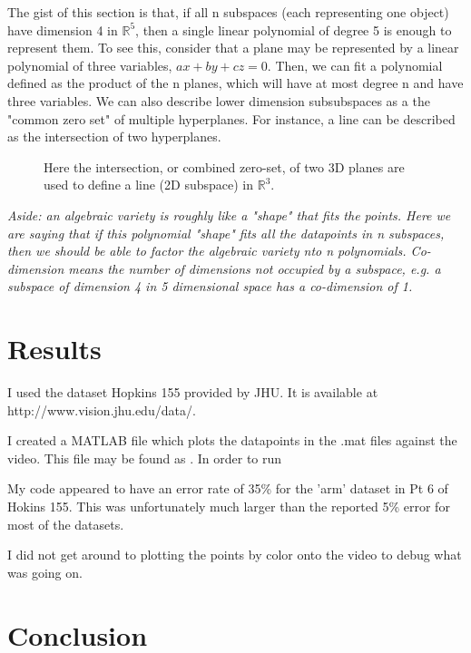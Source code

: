 \documentclass[a4paper]{article}
\begin{document}
 The gist of this section is that, if all n subspaces (each representing one object) have dimension 4 in $\mathbb{R}^5$, then a single linear
 polynomial of degree 5 is enough to represent them. To see this, consider that a plane may be represented by a linear polynomial of three variables,
 $ax+by+cz = 0$. Then, we can fit a polynomial defined as the product of the n planes, which will have at most degree n and have three variables. We
 can also describe lower dimension subsubspaces as a the "common zero set" of multiple hyperplanes. For instance, a line can be described as the
 intersection of two hyperplanes. 


 \begin{figure} \centering
     \caption{Here the intersection, or combined zero-set, of two 3D planes are used to define a line (2D subspace) in $\mathbb{R}^3$.} \end{figure}

 \textit{Aside: an algebraic variety is roughly like a "shape" that fits the points. Here we are saying that if this polynomial "shape" fits all the
 datapoints in n subspaces, then we should be able to factor the algebraic variety nto n polynomials.  Co-dimension means the number of dimensions not
 occupied by a subspace, e.g. a subspace of dimension 4 in 5 dimensional space has a co-dimension of 1. }
\section{Results}

I used the dataset Hopkins 155 provided by JHU. It is available at http://www.vision.jhu.edu/data/.

I created a MATLAB file which plots the datapoints in the .mat files against the video. This file may be found as . In order to run

My code appeared to have an error rate of 35\% for the 'arm' dataset in Pt 6 of Hokins 155. This was unfortunately much larger than the reported 5\%
error for most of the datasets.

I did not get around to plotting the points by color onto the video to debug what was going on.


\section{Conclusion}
\end{document}
